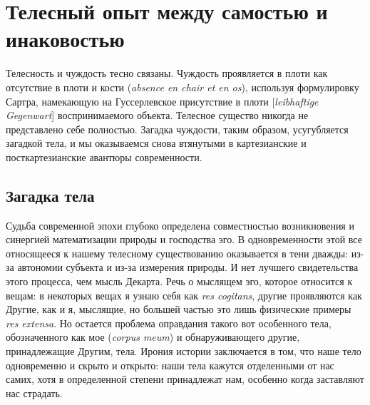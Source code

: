 \documentclass[12pt]{book}
\begin{document}
\chapter{Телесный опыт между самостью и инаковостью}

Телесность и чуждость тесно связаны. Чуждость проявляется в плоти как отсутствие в плоти и кости (\textit{absence en chair et en os}), используя формулировку Сартра, намекающую на Гуссерлевское присутствие в плоти [\textit{leibhaftige Gegenwart}] воспринимаемого объекта. Телесное существо никогда не представлено себе полностью. Загадка чуждости, таким образом, усугубляется загадкой тела, и мы оказываемся снова втянутыми в картезианские и посткартезианские авантюры современности.

\section{Загадка тела}

Судьба современной эпохи глубоко определена совместностью возникновения и синергией математизации природы и господства эго. В одновременности этой все относящееся к нашему телесному существованию оказывается в тени дважды: из-за автономии субъекта и из-за измерения природы. И нет лучшего свидетельства этого процесса, чем мысль Декарта. Речь о мыслящем эго, которое относится к вещам: в некоторых вещах я узнаю себя как \textit{res cogitans}, другие проявляются как Другие, как и я, мыслящие, но большей частью это лишь физические примеры \textit{res extensa}. Но остается проблема оправдания такого вот особенного тела, обозначенного как мое (\textit{corpus meum}) и обнаруживающего другие, принадлежащие Другим, тела. Ирония истории заключается в том, что наше тело одновременно и скрыто и открыто: наши тела кажутся отделенными от нас самих, хотя в определенной степени принадлежат нам, особенно когда заставляют нас страдать.
\end{document}
